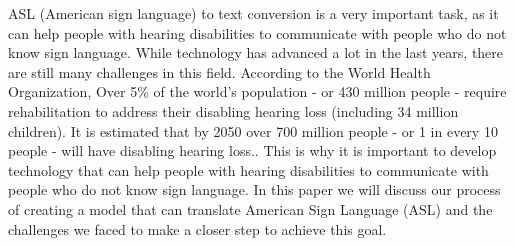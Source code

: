 \documentclass[../paper.tex]{subfiles}
\begin{document}
    ASL (American sign language) to text conversion is a very important task, as it can help people with hearing disabilities to communicate with people who do not know sign language.
    While technology has advanced a lot in the last years, there are still many challenges in this field.
    According to the World Health Organization, Over 5\% of the world's population - or 430 million people - require rehabilitation to address their disabling hearing loss (including 34 million children).
    It is estimated that by 2050 over 700 million people - or 1 in every 10 people - will have disabling hearing loss.\cite{i0}.
    This is why it is important to develop technology that can help people with hearing disabilities to communicate with people who do not know sign language.
    In this paper we will discuss our process of creating a model that can translate American Sign Language (ASL) and the challenges we faced to make a closer step to achieve this goal.
\end{document}
